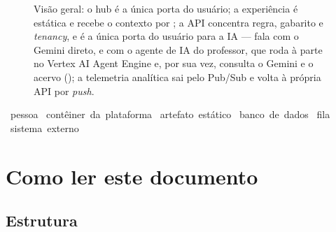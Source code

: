 \begin{figure}[H]
{\begin{tikzpicture}[x=1cm, y=1cm,
  every node/.append style={execute at begin node={\hyphenpenalty=10000\exhyphenpenalty=10000}},
  cx/.style={text width=29mm, minimum height=15mm}]
\end{tikzpicture}}
\caption[Visão geral da plataforma]{Visão geral: o hub é a única porta do
  usuário; a experiência é estática e recebe o contexto por ; a
  API concentra regra, gabarito e \textit{tenancy}, e é a única porta do
  usuário para a IA --- fala com o Gemini direto, e com o agente de IA do professor,
  que roda à parte no Vertex AI Agent Engine e, por sua vez, consulta o Gemini e
  o acervo (); a telemetria analítica sai pelo
  Pub/Sub e volta à própria API por \emph{push}.}
\label{fig:visao-geral}
\end{figure}

\begin{legendadiag}
\mbox{ pessoa} \quad
\mbox{ contêiner da plataforma} \quad
\mbox{ artefato estático} \quad
\mbox{ banco de dados} \quad
\mbox{ fila} \quad
\mbox{ sistema externo}
\end{legendadiag}

\section{Como ler este documento}

\subsection{Estrutura}

